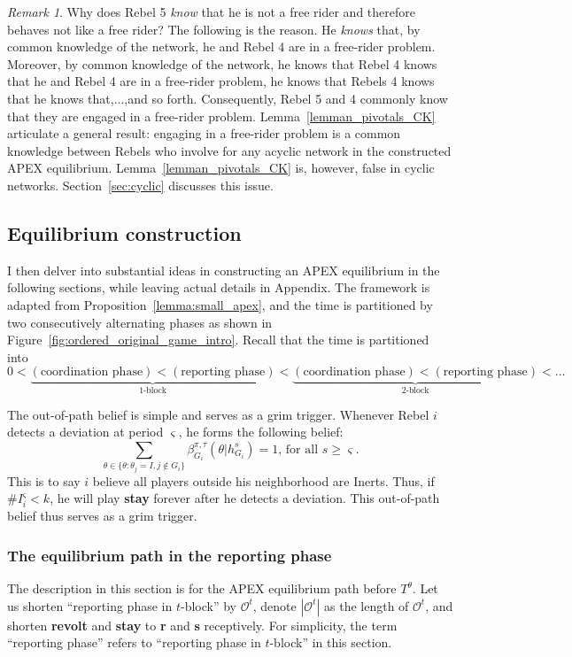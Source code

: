 \documentclass[12pt,letter]{article}
\newcommand{\Omicron}{\mathcal{O}}
\theoremstyle{definition}
\theoremstyle{remark}
\newtheorem*{remark}{Remark}
\theoremstyle{claim}
\begin{document}
\begin{remark}
Why does Rebel 5 \textit{know} that he is not a free rider and therefore behaves not like a free rider? The following is the reason. He \textit{knows} that, by common knowledge of the network, he and Rebel 4 are in a free-rider problem. Moreover, by common knowledge of the network, he knows that Rebel 4 knows that he and Rebel 4 are in a free-rider problem, he knows that Rebels 4 knows that he knows that,...,and so forth. Consequently, Rebel 5 and 4 commonly know that they are engaged in a free-rider problem. Lemma~\ref{lemman_pivotals_CK} articulate a general result: engaging in a free-rider problem is a common knowledge between Rebels who involve for any acyclic network in the constructed APEX equilibrium. Lemma~\ref{lemman_pivotals_CK} is, however, false in cyclic networks. Section~\ref{sec:cyclic} discusses this issue.
\end{remark}

\subsection{Equilibrium construction}
\label{sec:dis_writing}
I then delver into substantial ideas in constructing an APEX equilibrium in the following sections, while leaving actual details in Appendix. The framework is adapted from Proposition~\ref{lemma:small_apex}, and the time is partitioned by two consecutively alternating phases as shown in Figure~\ref{fig:ordered_original_game_intro}. Recall that the time is partitioned into
\[0<\underbrace{(\text{coordination phase})<(\text{reporting phase})}_{\text{$1$-block}}<\underbrace{(\text{coordination phase})<(\text{reporting phase})}_{\text{$2$-block}}<...\]

The out-of-path belief is simple and serves as a grim trigger. Whenever Rebel $i$ detects a deviation at period $\varsigma$, he forms the following belief: 
\begin{equation}
\label{eq_grim_trigger}
\sum_{\theta \in \{\theta:\theta_j=I,j\notin G_i\}}\beta^{\pi,\tau}_{G_i}({\theta}|h^{s}_{G_i})=1 \text{, for all $s\geq \varsigma$}.
\end{equation}
This is to say $i$ believe all players outside his neighborhood are Inerts. Thus, if $\# I^{\varsigma}_i<k$, he will play \textbf{stay} forever after he detects a deviation. This out-of-path belief thus serves as a grim trigger. 

\subsubsection{The equilibrium path in the reporting phase}
\label{sec:eq_rp}
The description in this section is for the APEX equilibrium path {before} $T^{\theta}$. Let us shorten ``reporting phase in $t$-block'' by $\Omicron^{t}$, denote $|\Omicron^t|$ as the length of $\Omicron^{t}$, and shorten \textbf{revolt} and \textbf{stay} to \textbf{r} and \textbf{s} receptively. For simplicity, the term ``reporting phase'' refers to ``reporting phase in $t$-block'' in this section.
\end{document}
